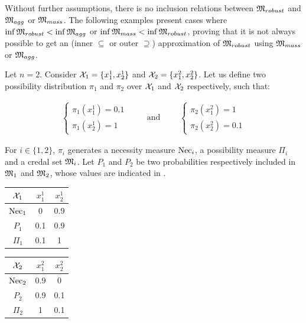 Without further assumptions, there is no inclusion relations between $\mathfrak{M}_{robust}$ and $\mathfrak{M}_{agg}$ or $\mathfrak{M}_{mass}$. The following examples present cases where $\inf\mathfrak{M}_{robust}<\inf\mathfrak{M}_{agg}$ or $\inf\mathfrak{M}_{mass}<\inf\mathfrak{M}_{robust}$, proving that it is not always possible to get an (inner $\subseteq$ or outer $\supseteq$) approximation of $\mathfrak{M}_{robust}$ using $\mathfrak{M}_{mass}$ or $\mathfrak{M}_{agg}$.

\begin{example}\label{ex:necessity}
    Let $n=2$. Consider $\mathcal{X}_1=\{x^1_1, x^1_2\}$ and $\mathcal{X}_2=\{x^2_1, x^2_2\}$. Let us define two possibility distribution $\pi_1$ and $\pi_2$ over $\mathcal{X}_1$ and $\mathcal{X}_2$ respectively, such that:

    \begin{eqnarray*}
    \begin{cases}
        \pi_1(x^1_1) = 0.1\\
        \pi_1(x^1_2) = 1
    \end{cases}
    \qquad\text{ and }\qquad
    \begin{cases}
        \pi_2(x^2_1)=1\\
        \pi_2(x^2_2)=0.1
    \end{cases}
    \end{eqnarray*}
    
    For $i\in\{1,2\}$, $\pi_i$ generates a necessity measure $\mathrm{Nec}_i$, a possibility measure $\Pi_i$ and a credal set $\mathfrak{M}_i$. Let $P_1$ and $P_2$ be two probabilities respectively included in $\mathfrak{M}_1$ and $\mathfrak{M}_2$,  whose values are indicated in . 
    
    \begin{center}
    \begin{tabular}{|c|c|c|}
        \hline
        $\mathcal{X}_1$ & $x^1_1$ & $x^1_2$\\
        \hline\hline
        $\mathrm{Nec}_1$ & 0 & 0.9\\
        \hline
        $P_1$  & 0.1 & 0.9\\
        \hline
        $\Pi_1$ & 0.1 & 1\\
        \hline
    \end{tabular}
    \qquad\qquad
    \begin{tabular}{|c|c|c|}
        \hline
        $\mathcal{X}_2$ & $x^2_1$ & $x^2_2$\\
        \hline\hline
        $\mathrm{Nec}_2$ & 0.9 & 0\\
        \hline
        $P_2$  & 0.9 & 0.1\\
        \hline
        $\Pi_2$ & 1 & 0.1\\
        \hline
    \end{tabular}
    \label{tab:proba_distrib_1}
    \end{center}


\end{example}
